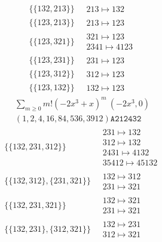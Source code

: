 \begin{scriptsize}
\begin{align}
\{\{132, 213\}\}
\ 
&
\begin{matrix}
213 \mapsto 132
\end{matrix}
\\
\{\{123, 213\}\}
\ 
&
\begin{matrix}
213 \mapsto 123
\end{matrix}
\\
\{\{123, 321\}\}
\ 
&
\begin{matrix}
321 \mapsto 123
\\
2341 \mapsto 4123
\end{matrix}
\\
\{\{123, 231\}\}
\ 
&
\begin{matrix}
231 \mapsto 123
\end{matrix}
\\
\{\{123, 312\}\}
\ 
&
\begin{matrix}
312 \mapsto 123
\end{matrix}
\\
\{\{123, 132\}\}
\ 
&
\begin{matrix}
132 \mapsto 123
\end{matrix}
\end{align}
$$
\begin{matrix}
\sum_{m \geq 0} m! \left(
-2 x^{3} + x
\right)^m
\ 
\left(-2 x^{3}, 0\right)
\\
\left(1, 2, 4, 16, 84, 536, 3912\right)
\texttt{A212432}
\end{matrix}
$$
\begin{align}
\{\{132, 231, 312\}\}
\ 
&
\begin{matrix}
231 \mapsto 132
\\
312 \mapsto 132
\\
2431 \mapsto 4132
\\
35412 \mapsto 45132
\end{matrix}
\\
\{\{132, 312\}, \{231, 321\}\}
\ 
&
\begin{matrix}
132 \mapsto 312
\\
231 \mapsto 321
\end{matrix}
\\
\{\{132, 231, 321\}\}
\ 
&
\begin{matrix}
132 \mapsto 321
\\
231 \mapsto 321
\end{matrix}
\\
\{\{132, 231\}, \{312, 321\}\}
\ 
&
\begin{matrix}
132 \mapsto 231
\\
312 \mapsto 321

\end{matrix}
\end{align}
\end{scriptsize}
